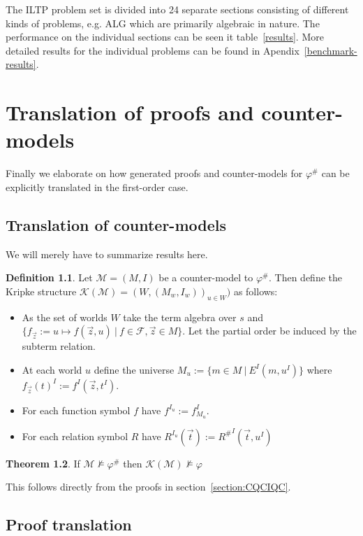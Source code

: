 \documentclass[a4paper,11pt]{report}
\theoremstyle{definition}
\newtheorem{theorem}{Theorem}[section]
\theoremstyle{definition}
\theoremstyle{definition}
\theoremstyle{definition}
\theoremstyle{definition}
\newtheorem{definition}[theorem]{Definition}
\theoremstyle{definition}
\theoremstyle{definition}
\begin{document}
	The ILTP problem set is divided into 24 separate sections consisting of different kinds of problems, e.g. ALG which are primarily algebraic in nature. The performance on the individual sections can be seen it table~\ref{results}.
	More detailed results for the individual problems can be found in Apendix~\ref{benchmark-results}.
	
	\chapter{Translation of proofs and counter-models}	

	Finally we elaborate on how generated proofs and counter-models for $\varphi^\#$ can be explicitly translated in the first-order case.
	
	\section{Translation of counter-models}
	 
	We will merely have to summarize results here.
	
	\begin{definition}
		Let $\mathcal M = (M, I)$ be a counter-model to $\varphi^\#$. Then define the Kripke structure $\mathcal K(\mathcal M) = (W, (M_w, I_w))_{u\in W})$ as follows:
		\begin{itemize}
			\item As the set of worlds $W$ take the term algebra over $s$ and $\{f_{\vec{z}} := u\mapsto f(\vec z, u)\:|\:f\in\mathcal F, \vec z\in M\}$. Let the partial order be induced by the subterm relation.
			\item At each world $u$ define the universe $M_u := \{m\in M\:|\:E^I(m, u^I)\}$ where $f_{\vec z}(t)^I := f^I(\vec z, t^I)$.
			\item For each function symbol $f$ have $f^{I_u} := f^I_{M_u}$.
			\item For each relation symbol $R$ have $R^{I_u}(\vec t) := {R^\#}^I(\vec t, u^I)$
		\end{itemize}
	\end{definition}
		
	\begin{theorem}
		If $\mathcal M\not\models\varphi^\#$ then $ \mathcal K(\mathcal M)\not\models\varphi$
	\end{theorem}
	
	This follows directly from the proofs in section~\ref{section:CQCIQC}.
	
	\section{Proof translation}
	
\end{document}
